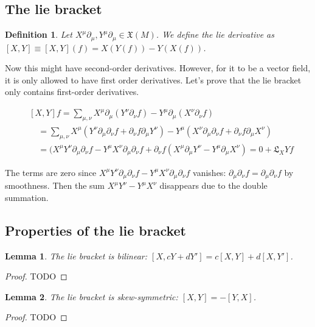 \documentclass[11pt]{book}
\newcommand{\Lie}{\ensuremath{\mathfrak{L}}}
\newtheorem{definition}{Definition}
\newtheorem{lemma}{Lemma}
\newtheorem{proof}{Proof}
\begin{document}
\subsection{The lie bracket}
\begin{definition}
Let $X^\mu \partial_\mu, Y^\mu \partial_\mu \in \mathfrak{X}(M)$. We define
the lie derivative as $[X, Y] \equiv [X, Y](f) = X(Y(f)) - Y(X(f))$. 
\end{definition}
Now this
might have second-order derivatives. However, for it to be a vector field,
it is only allowed to have first order derivatives. 
Let's prove that the lie bracket only contains first-order derivatives.

\begin{align*}
&[X, Y]f 
    = \sum_{\mu, \nu} X^\mu \partial_\mu (Y^\nu \partial_\nu f) - Y^\mu \partial_\mu (X^\nu \partial_\nu f)
\\ &\quad = \sum_{\mu, \nu} X^\mu (Y^\nu \partial_\mu \partial_\nu f + \partial_\nu f \partial_\mu Y^\nu)
         - Y^\mu (X^\nu \partial_\mu \partial_\nu f + \partial_\nu f \partial_\mu X^\nu)
%
\\ &\quad = (X^\mu Y^\nu \partial_\mu \partial_\nu f - Y^\mu X^\nu \partial_\mu \partial_\nu f + 
    \partial_\nu f (X^\mu \partial_\mu Y^\nu - Y^\mu  \partial_\mu X^\nu)
% 
= 0 + \Lie_X Y f             
\end{align*}

The terms are zero since $X^\mu Y^\nu \partial_\mu \partial_\nu f - Y^\mu X^\nu  \partial_\mu \partial_\nu f$
vanishes: $ \partial_\mu \partial_\nu f =  \partial_\mu \partial_\nu f$ by smoothness. Then the sum 
$X^\mu Y^\nu - Y^\mu X^\nu$ disappears due to the double summation.

\subsection{Properties of the lie bracket}

\begin{lemma}
The lie bracket is bilinear: $[X, cY + dY'] = c[X, Y] + d[X, Y']$.
\end{lemma}
\begin{proof}
TODO
\end{proof}

\begin{lemma}
The lie bracket is skew-symmetric: $[X, Y] = -[Y, X]$.
\end{lemma}
\begin{proof}
TODO
\end{proof}
\end{document}
